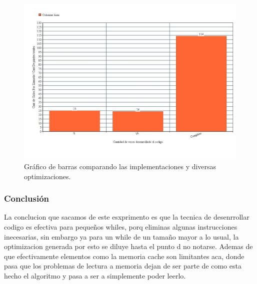 \begin{figure}[h!]
\centering
\captionsetup{justification=centering}
	\includegraphics[width = 15 cm, height = 8 cm]{imagenes/unroll.jpg}
	\caption[center]{Gráfico de barras comparando las implementaciones y diversas optimizaciones.}
\end{figure}

\medskip

	
\subsubsection{Conclusión}
La conclucion que sacamos de este esxprimento es que la tecnica de desenrrollar codigo es efectiva para pequeños whiles, porq eliminas algunas instrucciones inecesarias, sin embargo ya para un while de un tamaño mayor a lo usual, la optimizacion generada por esto se diluye hasta el punto d  no notarse. Ademas de que efectivamente elementos como la memoria cache son limitantes aca, donde pasa que los problemas de lectura a memoria dejan de ser parte de como esta hecho el algoritmo y pasa a ser a simplemente poder leerlo. 
 
